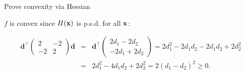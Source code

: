 \documentclass[11pt,compress,t,notes=noshow, xcolor=table]{beamer}
\begin{document}
\begin{vbframe}{Prove convexity via Hessian}
\begin{footnotesize}

$f$ is convex since $H(\mathbf{x})$ is p.s.d. for all $\mathbf{x}$:

\begin{eqnarray*}
\mathbf{d}^{\top}\begin{pmatrix} 2 & -2 \\ -2 & 2 \end{pmatrix}\mathbf{d} &=& \mathbf{d}^{\top} \begin{pmatrix} 2d_1 - 2d_2 \\ -2d_1 + 2d_2\end{pmatrix} = 2d_1^2 - 2d_1d_2 -2d_1d_2 + 2d_2^2 \\ &=& 2d_1^2 - 4d_1d_2 + 2d_2^2 = 2 (d_1 - d_2)^2 \ge 0.
\end{eqnarray*}


\end{footnotesize}

\end{vbframe}
\end{document}
